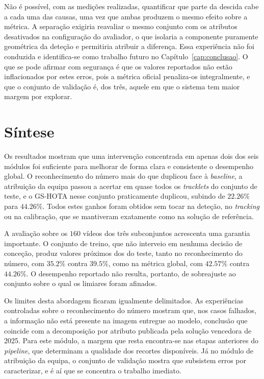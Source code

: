 Não é possível, com as medições realizadas, quantificar que parte da descida cabe a cada uma das causas, uma vez que ambas produzem o mesmo efeito sobre a métrica. A separação exigiria reavaliar o mesmo conjunto com os atributos desativados na configuração do avaliador, o que isolaria a componente puramente geométrica da deteção e permitiria atribuir a diferença. Essa experiência não foi conduzida e identifica-se como trabalho futuro no Capítulo~\ref{cap:conclusao}. O que se pode afirmar com segurança é que os valores reportados não estão inflacionados por estes erros, pois a métrica oficial penaliza-os integralmente, e que o conjunto de validação é, dos três, aquele em que o sistema tem maior margem por explorar.

\section{Síntese}

Os resultados mostram que uma intervenção concentrada em apenas dois dos seis módulos foi suficiente para melhorar de forma clara e consistente o desempenho global. O reconhecimento do número mais do que duplicou face à \emph{baseline}, a atribuição da equipa passou a acertar em quase todos os \emph{tracklets} do conjunto de teste, e o GS-HOTA nesse conjunto praticamente duplicou, subindo de $22.26\%$ para $44.26\%$. Todos estes ganhos foram obtidos sem tocar na deteção, no \emph{tracking} ou na calibração, que se mantiveram exatamente como na solução de referência.

A avaliação sobre os $160$ vídeos dos três subconjuntos acrescenta uma garantia importante. O conjunto de treino, que não interveio em nenhuma decisão de conceção, produz valores próximos dos do teste, tanto no reconhecimento do número, com $35.2\%$ contra $39.5\%$, como na métrica global, com $42.57\%$ contra $44.26\%$. O desempenho reportado não resulta, portanto, de sobreajuste ao conjunto sobre o qual os limiares foram afinados.

Os limites desta abordagem ficaram igualmente delimitados. As experiências controladas sobre o reconhecimento do número mostram que, nos casos falhados, a informação não está presente na imagem entregue ao modelo, conclusão que coincide com a decomposição por atributo publicada pela solução vencedora de 2025. Para este módulo, a margem que resta encontra-se nas etapas anteriores do \emph{pipeline}, que determinam a qualidade dos recortes disponíveis. Já no módulo de atribuição da equipa, o conjunto de validação mostra que subsistem erros por caracterizar, e é aí que se concentra o trabalho imediato.
